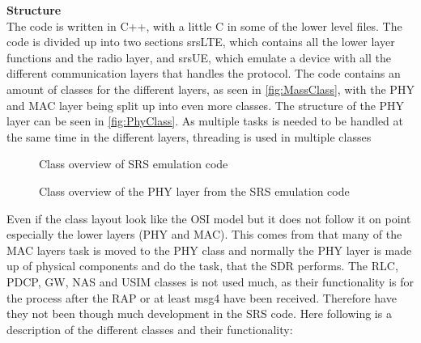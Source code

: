 \textbf{Structure}\\
The code is written in C++, with a little C in some of the lower level files. The code is divided up into two sections srsLTE, which contains all the lower layer functions and the radio layer, and srsUE, which emulate a device with all the different communication layers that handles the protocol. The code contains an amount of classes for the different layers, as seen in \autoref{fig:MassClass}, with the PHY and MAC layer being split up into even more classes. The structure of the PHY layer can be seen in \autoref{fig:PhyClass}. As multiple tasks is needed to be handled at the same time in the different layers, threading is used in multiple classes 

\begin{figure}[H]
\centering
{}
\resizebox{0.5\textwidth}{!}{
}
\caption{Class overview of SRS emulation code}
\label{fig:MassClass}
\end{figure}

\begin{figure}[H]
\centering
{}
\resizebox{0.5\textwidth}{!}{
}
\caption{Class overview of the PHY layer from the SRS emulation code}
\label{fig:PhyClass}
\end{figure}

Even if the class layout look like the OSI model but it does not follow it on point especially the lower layers (PHY and MAC). This comes from that many of the MAC layers task is moved to the PHY class and normally the PHY layer is made up of physical components and do the task, that the SDR performs. The RLC, PDCP, GW, NAS and USIM classes is not used much, as their functionality is for the process after the RAP or at least msg4 have been received. Therefore have they not been though much development in the SRS code. Here following is a description of the different classes and their functionality:


